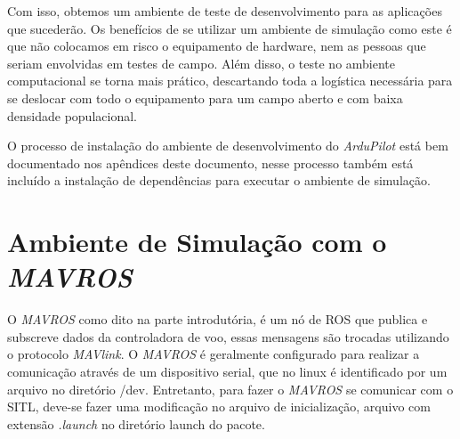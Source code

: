 \documentclass[12pt,a4paper,oneside]{book}
\begin{document}
Com isso, obtemos um ambiente de teste de desenvolvimento para as aplicações que sucederão. Os benefícios de se utilizar um ambiente de simulação como este é que não colocamos em risco o equipamento de hardware, nem as pessoas que seriam envolvidas em testes de campo. Além disso, o teste no ambiente computacional se torna mais prático, descartando toda a logística necessária para se deslocar com todo o equipamento para um campo aberto e com baixa densidade populacional.

O processo de instalação do ambiente de desenvolvimento do \textit{ArduPilot} está bem documentado nos apêndices deste documento, nesse processo também está incluído a instalação de dependências para executar o ambiente de simulação. 

\section{Ambiente de Simulação com o \textit{MAVROS}}

O \textit{MAVROS} como dito na parte introdutória, é um nó de ROS que publica e subscreve dados da controladora de voo, essas mensagens são trocadas utilizando o protocolo \textit{MAVlink}. O \textit{MAVROS} é geralmente configurado para realizar a comunicação através de um dispositivo serial, que no linux é identificado por um arquivo no diretório /dev. Entretanto, para fazer o \textit{MAVROS} se comunicar com o SITL, deve-se fazer uma modificação no arquivo de inicialização, arquivo com extensão \textit{.launch} no diretório launch do pacote.
\end{document}

